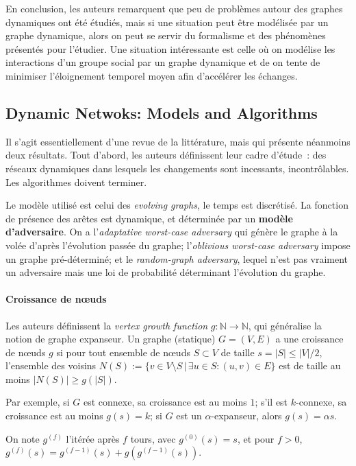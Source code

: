 \documentclass[12pt,a4paper]{article}
\begin{document}
En conclusion, les auteurs remarquent que peu de problèmes autour des
graphes dynamiques ont été étudiés, mais si une situation peut être
modélisée par un graphe dynamique, alors on peut se servir du
formalisme et des phénomènes présentés pour l'étudier. Une situation
intéressante est celle où on modélise les interactions d'un groupe
social par un graphe dynamique et de on tente de minimiser
l'éloignement temporel moyen afin d'accélérer les échanges.

\subsection{Dynamic Netwoks: Models and
  Algorithms~\cite{kuhn2011dynamic}}

Il s'agit essentiellement d'une revue de la littérature, mais qui
présente néanmoins deux résultats. Tout d'abord, les auteurs
définissent leur cadre d'étude~: des réseaux dynamiques dans lesquels
les changements sont incessants, incontrôlables. Les algorithmes
doivent terminer.

Le modèle utilisé est celui des \textit{evolving graphs}, le temps est
discrétisé. La fonction de présence des arêtes est dynamique, et
déterminée par un \textbf{modèle d'adversaire}. On a
l'\textit{adaptative worst-case adversary} qui génère le graphe à la
volée d'après l'évolution passée du graphe; l'\textit{oblivious
  worst-case adversary} impose un graphe pré-déterminé; et le
\textit{random-graph adversary}, lequel n'est pas vraiment un
adversaire mais une loi de probabilité déterminant l'évolution du
graphe.

\paragraph{Croissance de nœuds} Les auteurs définissent la
\textit{vertex growth function} \(g : \mathbb{N} \to \mathbb{N}\), qui
généralise la notion de graphe expanseur. Un graphe (statique)
\(G = (V, E)\) a une croissance de nœuds \(g\) si pour tout ensemble
de nœuds \(S \subset V\) de taille \(s = |S| \leq |V|/2\), l'ensemble
des voisins
\(N(S) := \{v \in V \setminus S \,|\, \exists u \in S : (u, v) \in
E\}\) est de taille au moins \(|N(S)| \geq g(|S|)\).

Par exemple, si \(G\) est connexe, sa croissance est au moins \(1\);
s'il est \(k\)-connexe, sa croissance est au moins \(g(s) = k\); si
\(G\) est un \(\alpha\)-expanseur, alors \(g(s) = \alpha s\).

On note \(g^{(f)}\) l'itérée après \(f\) tours, avec
\(g^{(0)}(s) = s\), et pour \(f > 0\),
\(g^{(f)}(s) = g^{(f-1)}(s) + g(g^{(f-1)}(s))\).
\end{document}
